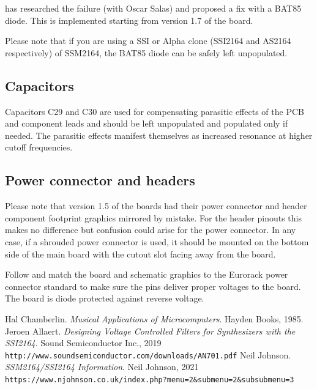 \documentclass{article}
\begin{document}
\cite{johnson} has researched the failure (with Oscar Salas) and proposed a fix with a BAT85 diode. This is implemented starting from version 1.7 of the board.\newline

Please note that if you are using a SSI or Alpha clone (SSI2164 and AS2164 respectively) of SSM2164, the BAT85 diode can be safely left unpopulated.

\subsection{Capacitors}
Capacitors C29 and C30 are used for compensating parasitic effects of the PCB and component leads and should be left unpopulated and populated only if needed. The parasitic effects manifest themselves as increased resonance at higher cutoff frequencies.

\subsection{Power connector and headers}
Please note that version 1.5 of the boards had their power connector and header component footprint graphics mirrored by mistake. For the header pinouts this makes no difference but confusion could arise for the power connector. In any case, if a shrouded power connector is used, it should be mounted on the bottom side of the main board with the cutout slot facing away from the board.\newline

Follow and match the board and schematic graphics to the Eurorack power connector standard to make sure the pins deliver proper voltages to the board. The board is diode protected against reverse voltage.

\begin{thebibliography}{9}
Hal Chamberlin.
\textit{Musical Applications of Microcomputers}.
Hayden Books, 1985.
Jeroen Allaert.
\textit{Designing Voltage Controlled Filters for Synthesizers with the SSI2164}.
Sound Semiconductor Inc., 2019
\\\texttt{http://www.soundsemiconductor.com/downloads/AN701.pdf}
Neil Johnson.
\textit{SSM2164/SSI2164 Information}.
Neil Johnson, 2021
\\\texttt{https://www.njohnson.co.uk/index.php?menu=2\&submenu=2\&subsubmenu=3}
\end{thebibliography}
\end{document}
